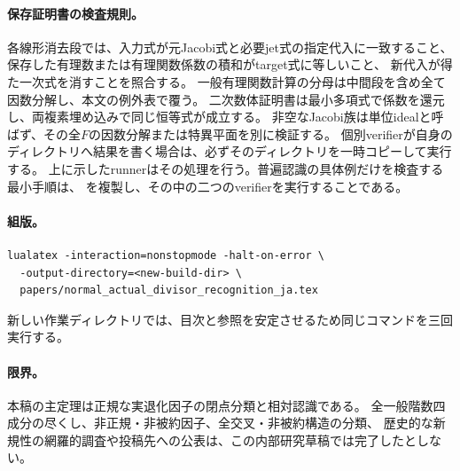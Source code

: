 \documentclass[11pt,a4paper]{ltjsarticle}
\theoremstyle{remark}\newtheorem{remark}[theorem]{注意}
\begin{document}
\paragraph{保存証明書の検査規則。}
各線形消去段では、入力式が元Jacobi式と必要jet式の指定代入に一致すること、
保存した有理数または有理関数係数の積和がtarget式に等しいこと、
新代入が得た一次式を消すことを照合する。
一般有理関数計算の分母は中間段を含め全て因数分解し、本文の例外表で覆う。
二次数体証明書は最小多項式で係数を還元し、両複素埋め込みで同じ恒等式が成立する。
非空なJacobi族は単位idealと呼ばず、その全$F$の因数分解または特異平面を別に検証する。
個別verifierが自身のディレクトリへ結果を書く場合は、必ずそのディレクトリを一時コピーして実行する。
上に示したrunnerはその処理を行う。普遍認識の具体例だけを検査する最小手順は、
を複製し、その中の二つのverifierを実行することである。
\paragraph{組版。}
\begin{verbatim}
lualatex -interaction=nonstopmode -halt-on-error \
  -output-directory=<new-build-dir> \
  papers/normal_actual_divisor_recognition_ja.tex
\end{verbatim}
新しい作業ディレクトリでは、目次と参照を安定させるため同じコマンドを三回実行する。
\paragraph{限界。}
本稿の主定理は正規な実退化因子の閉点分類と相対認識である。
全一般階数四成分の尽くし、非正規・非被約因子、全交叉・非被約構造の分類、
歴史的な新規性の網羅的調査や投稿先への公表は、この内部研究草稿では完了したとしない。
\end{document}
